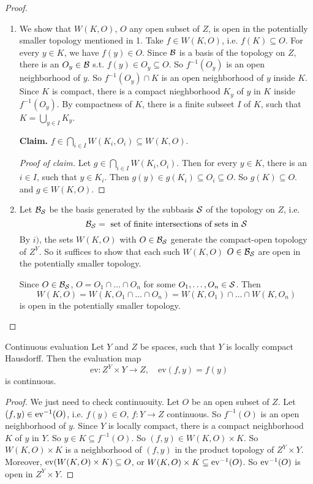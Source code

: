\documentclass[language=english]{TemplateLecture}
\begin{document}
\begin{proof}
    \begin{enumerate}
        \item We show that \(W(K,O)\), \(O\) any open subset of \(Z\), is open in the potentially smaller topology mentioned in 1. Take \(f \in W(K,O)\), i.e. \(f(K) \subseteq O\). For every \(y \in K\), we have \(f(y) \in O\). Since \(\mathcal{B}\) is a basis of the topology on \(Z\), there is an \(O_y \in \mathcal{B}\) s.t. \(f(y) \in O_y \subseteq O\). So \(f^{-1}(O_y)\) is an open neighborhood of \(y\). So \(f^{-1}(O_y) \cap K\) is an open neighborhood of \(y\) inside \(K\). Since \(K\) is compact, there is a compact nieghborhood \(K_y\) of \(y\) in \(K\) inside \(f^{-1}(O_y)\). By compactness of \(K\), there is a finite subseet \(I\) of \(K\), such that \(K = \bigcup_{y \in I} K_y\).
        
        \textbf{Claim.} \(f \in \bigcap_{i \in I} W(K_i, O_i) \subseteq W(K,O)\).
        \begin{proof}[Proof of claim]
            Let \(g \in \bigcap_{i \in I} W(K_i, O_i)\). Then for every \(y \in K\), there is an \(i \in I\), such that \(y \in K_i\). Then \(g(y) \in g(K_i) \subseteq O_i \subseteq O\). So \(g(K) \subseteq O\). and \(g \in W(K,O)\).
        \end{proof}
        \item Let \(\mathcal{B}_{\mathcal{S}}\) be the basis generated by the subbasis \(\mathcal{S}\) of the topology on \(Z\), i.e.
        \[\mathcal{B}_{\mathcal{S}} = \text{ set of finite intersections of sets in } \mathcal{S}\]
        By \(i)\), the sets \(W(K,O)\) with \(O \in \mathcal{B}_{\mathcal{S}}\) generate the compact-open topology of \(Z^Y\). So it suffices to show that each such \(W(K,O)\) \(O \in \mathcal{B}_{\mathcal{S}}\) are open in the potentially smaller topology.

        Since \(O \in \mathcal{B}_{\mathcal{S}}\), \(O = O_1 \cap \dots \cap O_n\) for some \(O_1, \dots, O_n \in \mathcal{S}\). Then
        \[W(K,O) = W(K, O_1\cap \dots \cap O_n) = W(K, O_1) \cap \dots \cap W(K, O_n)\]
        is open in the potentially smaller topology.
    \end{enumerate}
\end{proof}

\begin{thm}{Continuous evaluation}{}
    Let \(Y\) and \(Z\) be spaces, such that \(Y\) is locally compact Hausdorff. Then the evaluation map
    \[\mathrm{ev}\colon Z^Y \times Y \to Z, \quad \mathrm{ev}(f,y) = f(y)\]
    is continuous.
\end{thm}

\begin{proof}
    We just need to check continuouity. Let \(O\) be an open subset of \(Z\). Let \((f,y) \in \mathrm{ev}^{-1}(O)\), i.e. \(f(y) \in O\), \(f\colon Y \to Z\) continuous. So \(f^{-1}(O)\) is an open neighborhood of \(y\). Since \(Y\) is locally compact, there is a compact neighborhood \(K\) of \(y\) in \(Y\). So \(y \in K\subseteq f^{-1}(O)\). So \((f,y) \in W(K,O) \times K\). So \(W(K,O) \times K\) is a neighborhood of \((f,y)\) in the product topology of \(Z^Y \times Y\). Moreover, \(\mathrm{ev}(W(K,O) \times K) \subseteq O\), or \(W(K,O) \times K \subseteq \mathrm{ev}^{-1}(O)\). So \(\mathrm{ev}^{-1}(O)\) is open in \(Z^Y \times Y\).
\end{proof}
\end{document}
